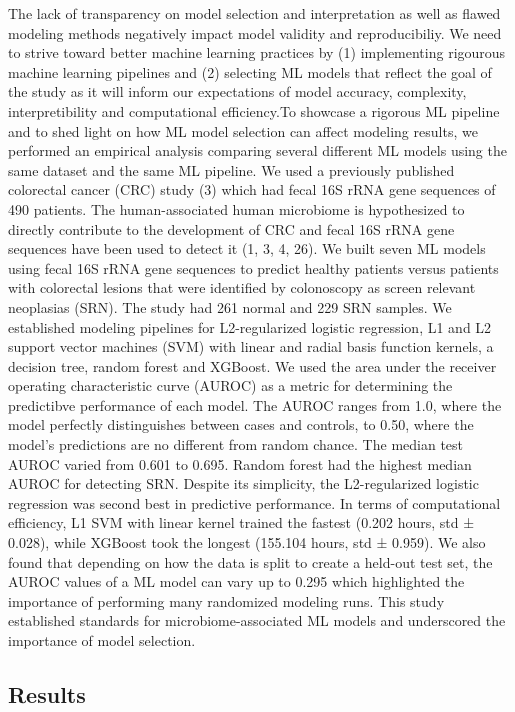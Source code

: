 \documentclass[11pt,]{article}
\begin{document}
The lack of transparency on model selection and interpretation as well
as flawed modeling methods negatively impact model validity and
reproducibiliy. We need to strive toward better machine learning
practices by (1) implementing rigourous machine learning pipelines and
(2) selecting ML models that reflect the goal of the study as it will
inform our expectations of model accuracy, complexity, interpretibility
and computational efficiency.To showcase a rigorous ML pipeline and to
shed light on how ML model selection can affect modeling results, we
performed an empirical analysis comparing several different ML models
using the same dataset and the same ML pipeline. We used a previously
published colorectal cancer (CRC) study (3) which had fecal 16S rRNA
gene sequences of 490 patients. The human-associated human microbiome is
hypothesized to directly contribute to the development of CRC and fecal
16S rRNA gene sequences have been used to detect it (1, 3, 4, 26). We
built seven ML models using fecal 16S rRNA gene sequences to predict
healthy patients versus patients with colorectal lesions that were
identified by colonoscopy as screen relevant neoplasias (SRN). The study
had 261 normal and 229 SRN samples. We established modeling pipelines
for L2-regularized logistic regression, L1 and L2 support vector
machines (SVM) with linear and radial basis function kernels, a decision
tree, random forest and XGBoost. We used the area under the receiver
operating characteristic curve (AUROC) as a metric for determining the
predictibve performance of each model. The AUROC ranges from 1.0, where
the model perfectly distinguishes between cases and controls, to 0.50,
where the model's predictions are no different from random chance. The
median test AUROC varied from 0.601 to 0.695. Random forest had the
highest median AUROC for detecting SRN. Despite its simplicity, the
L2-regularized logistic regression was second best in predictive
performance. In terms of computational efficiency, L1 SVM with linear
kernel trained the fastest (0.202 hours, std ± 0.028), while XGBoost
took the longest (155.104 hours, std ± 0.959). We also found that
depending on how the data is split to create a held-out test set, the
AUROC values of a ML model can vary up to 0.295 which highlighted the
importance of performing many randomized modeling runs. This study
established standards for microbiome-associated ML models and
underscored the importance of model selection.

\subsection{Results}\label{results}
\end{document}

